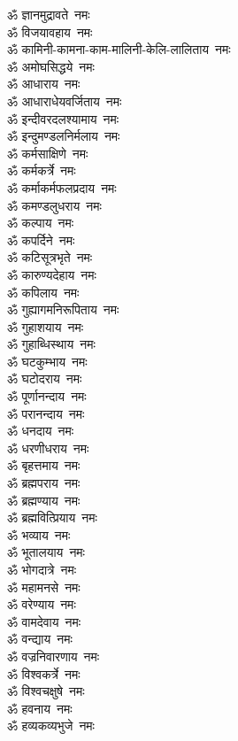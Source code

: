 \begin{multicols}{2}
\begin{flushleft}
ॐ ज्ञानमुद्रावते~नमः\\
ॐ विजयावहाय~नमः\\
ॐ कामिनी-कामना-काम-मालिनी-केलि-लालिताय~नमः\\
ॐ अमोघसिद्धये~नमः\\
ॐ आधाराय~नमः\\
ॐ आधाराधेयवर्जिताय~नमः\\
ॐ इन्दीवरदलश्यामाय~नमः\\
ॐ इन्दुमण्डलनिर्मलाय~नमः\\
ॐ कर्मसाक्षिणे~नमः\\
ॐ कर्मकर्त्रे~नमः\hfill{}\\
ॐ कर्माकर्मफलप्रदाय~नमः\\
ॐ कमण्डलुधराय~नमः\\
ॐ कल्पाय~नमः\\
ॐ कपर्दिने~नमः\\
ॐ कटिसूत्रभृते~नमः\\
ॐ कारुण्यदेहाय~नमः\\
ॐ कपिलाय~नमः\\
ॐ गुह्यागमनिरूपिताय~नमः\\
ॐ गुहाशयाय~नमः\\
ॐ गुहाब्धिस्थाय~नमः\hfill{}\\
ॐ घटकुम्भाय~नमः\\
ॐ घटोदराय~नमः\\
ॐ पूर्णानन्दाय~नमः\\
ॐ परानन्दाय~नमः\\
ॐ धनदाय~नमः\\
ॐ धरणीधराय~नमः\\
ॐ बृहत्तमाय~नमः\\
ॐ ब्रह्मपराय~नमः\\
ॐ ब्रह्मण्याय~नमः\\
ॐ ब्रह्मवित्प्रियाय~नमः\hfill{}\\
ॐ भव्याय~नमः\\
ॐ भूतालयाय~नमः\\
ॐ भोगदात्रे~नमः\\
ॐ महामनसे~नमः\\
ॐ वरेण्याय~नमः\\
ॐ वामदेवाय~नमः\\
ॐ वन्द्याय~नमः\\
ॐ वज्रनिवारणाय~नमः\\
ॐ विश्वकर्त्रे~नमः\\
ॐ विश्वचक्षुषे~नमः\hfill{}\\
ॐ हवनाय~नमः\\
ॐ हव्यकव्यभुजे~नमः\\

\end{flushleft}
\end{multicols}
